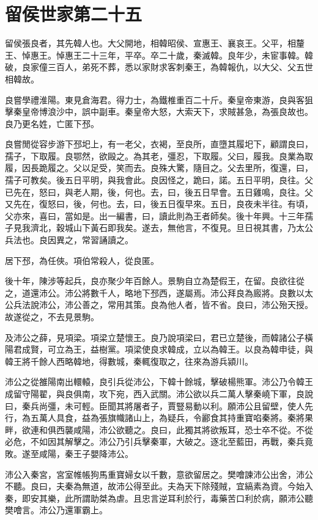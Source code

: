 \chapter{留侯世家第二十五}

留侯張良者，其先韓人也。大父開地，相韓昭侯、宣惠王、襄哀王。父平，相釐王、悼惠王。悼惠王二十三年，平卒。卒二十歲，秦滅韓。良年少，未宦事韓。韓破，良家僮三百人，弟死不葬，悉以家財求客刺秦王，為韓報仇，以大父、父五世相韓故。

良嘗學禮淮陽。東見倉海君。得力士，為鐵椎重百二十斤。秦皇帝東游，良與客狙擊秦皇帝博浪沙中，誤中副車。秦皇帝大怒，大索天下，求賊甚急，為張良故也。良乃更名姓，亡匿下邳。

良嘗閒從容步游下邳圯上，有一老父，衣褐，至良所，直墮其履圯下，顧謂良曰，孺子，下取履。良鄂然，欲毆之。為其老，彊忍，下取履。父曰，履我。良業為取履，因長跪履之。父以足受，笑而去。良殊大驚，隨目之。父去里所，復還，曰，孺子可教矣。後五日平明，與我會此。良因怪之，跪曰，諾。五日平明，良往。父已先在，怒曰，與老人期，後，何也。去，曰，後五日早會。五日雞鳴，良往。父又先在，復怒曰，後，何也。去，曰，後五日復早來。五日，良夜未半往。有頃，父亦來，喜曰，當如是。出一編書，曰，讀此則為王者師矣。後十年興。十三年孺子見我濟北，穀城山下黃石即我矣。遂去，無他言，不復見。旦日視其書，乃太公兵法也。良因異之，常習誦讀之。

居下邳，為任俠。項伯常殺人，從良匿。

後十年，陳涉等起兵，良亦聚少年百餘人。景駒自立為楚假王，在留。良欲往從之，道還沛公。沛公將數千人，略地下邳西，遂屬焉。沛公拜良為廄將。良數以太公兵法說沛公，沛公善之，常用其策。良為他人者，皆不省。良曰，沛公殆天授。故遂從之，不去見景駒。

及沛公之薛，見項梁。項梁立楚懷王。良乃說項梁曰，君已立楚後，而韓諸公子橫陽君成賢，可立為王，益樹黨。項梁使良求韓成，立以為韓王。以良為韓申徒，與韓王將千餘人西略韓地，得數城，秦輒復取之，往來為游兵潁川。

沛公之從雒陽南出轘轅，良引兵從沛公，下韓十餘城，擊破楊熊軍。沛公乃令韓王成留守陽翟，與良俱南，攻下宛，西入武關。沛公欲以兵二萬人擊秦嶢下軍，良說曰，秦兵尚彊，未可輕。臣聞其將屠者子，賈豎易動以利。願沛公且留壁，使人先行，為五萬人具食，益為張旗幟諸山上，為疑兵，令酈食其持重寶啗秦將。秦將果畔，欲連和俱西襲咸陽，沛公欲聽之。良曰，此獨其將欲叛耳，恐士卒不從。不從必危，不如因其解擊之。沛公乃引兵擊秦軍，大破之。逐北至藍田，再戰，秦兵竟敗。遂至咸陽，秦王子嬰降沛公。

沛公入秦宮，宮室帷帳狗馬重寶婦女以千數，意欲留居之。樊噲諫沛公出舍，沛公不聽。良曰，夫秦為無道，故沛公得至此。夫為天下除殘賊，宜縞素為資。今始入秦，即安其樂，此所謂助桀為虐。且忠言逆耳利於行，毒藥苦口利於病，願沛公聽樊噲言。沛公乃還軍霸上。

